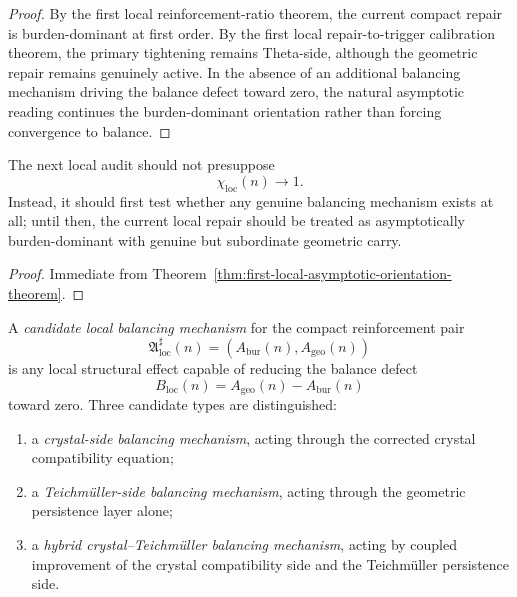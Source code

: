 \begin{proof}
By the first local reinforcement-ratio theorem, the current compact repair is burden-dominant at first order. By the first local repair-to-trigger calibration theorem, the primary tightening remains Theta-side, although the geometric repair remains genuinely active. In the absence of an additional balancing mechanism driving the balance defect toward zero, the natural asymptotic reading continues the burden-dominant orientation rather than forcing convergence to balance.
\end{proof}

\begin{corollary}
\label{cor:current-asymptotic-working-rule}
The next local audit should not presuppose
\[
  \chi_{\mathrm{loc}}(n)\to 1.
\]
Instead, it should first test whether any genuine balancing mechanism exists at all; until then, the current local repair should be treated as asymptotically burden-dominant with genuine but subordinate geometric carry.
\end{corollary}

\begin{proof}
Immediate from Theorem~\ref{thm:first-local-asymptotic-orientation-theorem}.
\end{proof}

\begin{definition}
\label{def:candidate-local-balancing-mechanisms}
A \emph{candidate local balancing mechanism} for the compact reinforcement pair
\[
  \mathfrak A_{\mathrm{loc}}^{\sharp}(n)=(A_{\mathrm{bur}}(n),A_{\mathrm{geo}}(n))
\]
is any local structural effect capable of reducing the balance defect
\[
  B_{\mathrm{loc}}(n)=A_{\mathrm{geo}}(n)-A_{\mathrm{bur}}(n)
\]
toward zero. Three candidate types are distinguished:
\begin{enumerate}[leftmargin=2em,label=(\alph*)]
  \item a \emph{crystal-side balancing mechanism}, acting through the corrected crystal compatibility equation;
  \item a \emph{Teichm\"uller-side balancing mechanism}, acting through the geometric persistence layer alone;
  \item a \emph{hybrid crystal--Teichm\"uller balancing mechanism}, acting by coupled improvement of the crystal compatibility side and the Teichm\"uller persistence side.
\end{enumerate}
\end{definition}

